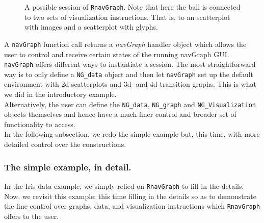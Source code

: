 \documentclass[12pt,oneside,titlepage,letter]{article}
\begin{document}
\begin{figure}[h]
\begin{center}
\end{center}
  \caption{A possible session of \texttt{RnavGraph}. Note that here the ball is connected to two sets of visualization instructions. That is, to an scatterplot with images and a scatterplot with glyphs.}
  \label{fig:exampleSession}
\end{figure}

A \texttt{navGraph} function call returns a \textit{navGraph} handler object which allows the user to control and receive certain states of the running navGraph GUI.\\


\texttt{navGraph} offers different ways to instantiate a session. 
The most straightforward way is to only define a \texttt{NG\_data} object and then let \texttt{navGraph} set up the default environment with 2d scatterplots and 3d- and 4d transition graphs.
This is what we did in the introductory example.\\
 Alternatively, the user can define the \texttt{NG\_data}, \texttt{NG\_graph} and \texttt{NG\_Visualization} objects themselves
 and hence have a much finer control and broader set of functionality to access. \\
 
 In the following subsection, we redo the simple example but, this time, with more detailed control over the constructions.
 
\subsubsection{The simple example, in detail.}
In the Iris data example, we simply relied on \texttt{RnavGraph} to fill in the details.
Now, we revisit this example; this time filling in the details so as to demonstrate the fine control
over graphs, data, and visualization instructions which \texttt{RnavGraph} offers to the user.\\
\end{document}
